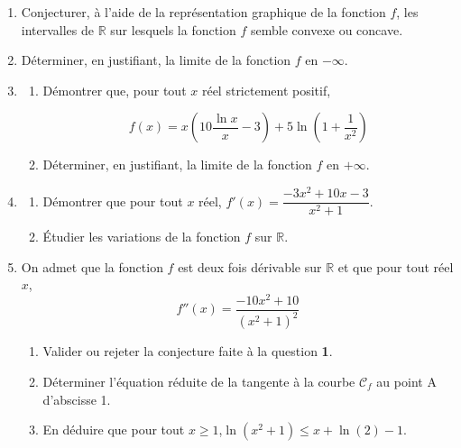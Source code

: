 \documentclass[10pt]{article}
\providecommand{\R}{\mathbb{R}}
\begin{document}
\begin{enumerate}
\item Conjecturer, à l'aide de la représentation graphique de la fonction $f$, les intervalles de $\R$ sur lesquels la fonction $f$ semble convexe ou concave.
\item Déterminer, en justifiant, la limite de la fonction $f$ en $-\infty$.
\item
	\begin{enumerate}
		\item Démontrer que, pour tout $x$ réel strictement positif,

\[f(x)=x\left(10 \dfrac{\ln x}{x}-3\right)+5 \ln \left(1+\dfrac{1}{x^{2}}\right)\]

		\item Déterminer, en justifiant, la limite de la fonction $f$ en $+\infty$.\end{enumerate}
\item
	\begin{enumerate}
		\item Démontrer que pour tout $x$ réel, \quad $f'(x)= \dfrac{-3 x^{2}+10 x-3}{x^{2}+1}$.
		\item Étudier les variations de la fonction $f$ sur $\R$.
	\end{enumerate}
	\item On admet que la fonction $f$ est deux fois dérivable sur $\R$ et que pour tout réel $x$,
	\[f''(x)=\dfrac{-10 x^{2}+10}{\left(x^{2}+1\right)^{2}}\]

	\begin{enumerate}
		\item Valider ou rejeter la conjecture faite à la question \textbf{1}.
		\item Déterminer l'équation réduite de la tangente à la courbe $\mathcal{C}_{f}$ au point A d'abscisse 1.
		\item En déduire que pour tout $x \geqslant 1$,\quad $\ln \left(x^{2}+1\right) \leqslant x+\ln (2)-1$.
	\end{enumerate}
	\end{enumerate}
\end{document}
